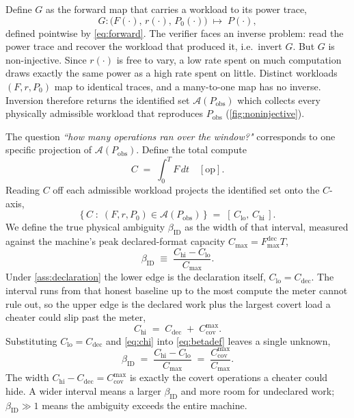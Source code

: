 \documentclass{article}
\theoremstyle{plain}
\theoremstyle{definition}
\theoremstyle{remark}
\begin{document}
Define $G$ as the forward map that carries a workload to its power trace,
\begin{equation}
	G : \bigl(F(\cdot),\, r(\cdot),\, P_0(\cdot)\bigr) \;\longmapsto\; P(\cdot),
	\label{eq:operator}
\end{equation}
defined pointwise by \cref{eq:forward}. The verifier faces an inverse
problem: read the power trace and recover the workload that produced it,
i.e.\ invert $G$. But $G$ is non-injective. Since $r(\cdot)$ is free
to vary, a low rate spent on much computation draws exactly the same power as
a high rate spent on little. Distinct workloads $(F,r,P_0)$ map to identical
traces, and a many-to-one map has no inverse. Inversion therefore returns the identified set $\mathcal{A}(P_{\mathrm{obs}})$ which
collects every physically admissible workload that reproduces
$P_{\mathrm{obs}}$ (\cref{fig:noninjective}).

The question \emph{``how many operations ran over the window?"} corresponds to one
specific projection of $\mathcal{A}(P_{\mathrm{obs}})$. Define the total
compute
\begin{equation}
	C \;=\; \int_0^T F\,dt \quad [\text{op}].
	\label{eq:totalcompute}
\end{equation}
Reading $C$ off each admissible workload projects the identified set onto the
$C$-axis,
\begin{equation}
	\bigl\{\, C \;:\; (F,r,P_0) \in \mathcal{A}(P_{\mathrm{obs}}) \,\bigr\} \;=\;
	[\,C_{\mathrm{lo}},\, C_{\mathrm{hi}}\,].
	\label{eq:projection}
\end{equation}
We define the true physical ambiguity $\beta_{\mathrm{ID}}$ as the width of
that interval, measured against the
machine's peak declared-format capacity $C_{\max} = F_{\max}^{\mathrm{dec}}T$,
\begin{equation}
	\beta_{\mathrm{ID}} \;\equiv\; \frac{C_{\mathrm{hi}} - C_{\mathrm{lo}}}{C_{\max}}.
	\label{eq:betadef}
\end{equation}
Under \cref{ass:declaration} the lower edge is the declaration itself,
$C_{\mathrm{lo}} = C_{\mathrm{dec}}$.
The interval runs from that honest baseline up to
the most compute the meter cannot rule out, so the upper edge is the declared
work plus the largest covert load a cheater could slip past the meter,
\begin{equation}
	C_{\mathrm{hi}} \;=\; C_{\mathrm{dec}} \;+\; C_{\mathrm{cov}}^{\max}.
	\label{eq:chi}
\end{equation}
Substituting $C_{\mathrm{lo}} = C_{\mathrm{dec}}$ and \cref{eq:chi} into
\cref{eq:betadef} leaves a single unknown,
\begin{equation}
	\beta_{\mathrm{ID}} \;=\; \frac{C_{\mathrm{hi}} - C_{\mathrm{lo}}}{C_{\max}}
	\;=\; \frac{C_{\mathrm{cov}}^{\max}}{C_{\max}}.
	\label{eq:beta-reduced}
\end{equation}
The width $C_{\mathrm{hi}} - C_{\mathrm{dec}} = C_{\mathrm{cov}}^{\max}$ is
exactly the covert operations a cheater could hide. A wider interval means a larger
$\beta_{\mathrm{ID}}$ and more room for undeclared work;
$\beta_{\mathrm{ID}} \gg 1$ means the ambiguity
exceeds the entire machine.
\end{document}
